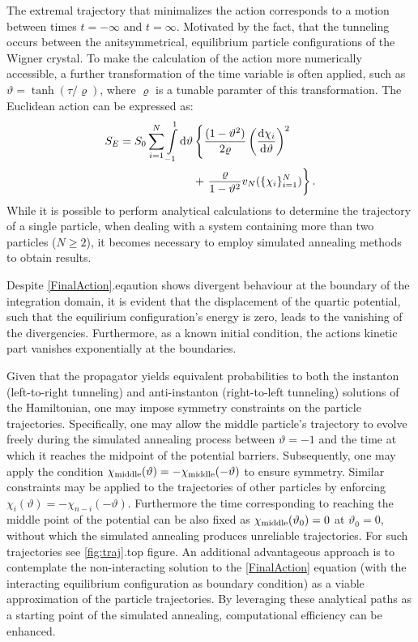\documentclass[prb,twocolumn,showpacs,preprintnumbers,amsmath,amssymb, superscriptaddress]{revtex4-2}
\newcommand{\n}{N}
\newcommand{\1}{{1\hspace*{-0.5ex} \textrm{l} \hspace*{0.5ex}}}
\begin{document}
The extremal trajectory that minimalizes the action corresponds to a motion between times $t = -\infty$ and $t = \infty$. Motivated by the fact, that the tunneling occurs between the anitsymmetrical, equilibrium particle configurations of the Wigner crystal. To make the calculation of the action more numerically accessible, a further transformation of the time variable is often applied, such as $\vartheta = \tanh\left( {\tau}/{\varrho} \right)$, where $\varrho$ is a tunable paramter of this transformation. The Euclidean action can be expressed as:
\begin{align}\label{FinalAction}
S_E = S_0 \sum_{i = 1}^\n \int\limits_{-1}^{1} {\rm{d}}\vartheta &\left\lbrace \frac{(1 - \vartheta^2)}{2\varrho} \left( \frac{{\rm{d}}\chi_i}{{\rm{d}}\vartheta} \right)^2 \right.\\ \nonumber
&+ \left. \frac{\varrho}{1 - \vartheta^2} v_\n(\{\chi_i\}_{i=1}^\n) \right\rbrace.
\end{align}
While it is possible to perform analytical calculations to determine the trajectory of a single particle, when dealing with a system containing more than two particles ($N \geq 2$), it becomes necessary to employ simulated annealing methods to obtain results.

Despite \eqref{FinalAction}.eqaution shows divergent behaviour at the boundary of the integration domain, it is evident that the displacement of the quartic potential, such that the equilirium configuration's energy is zero, leads to the vanishing of the divergencies. Furthermore, as a known initial condition, the actions kinetic part vanishes exponentially at the boundaries.

Given that the propagator yields equivalent probabilities to both the instanton (left-to-right tunneling) and anti-instanton (right-to-left tunneling) solutions of the Hamiltonian, one may impose symmetry constraints on the particle trajectories. Specifically, one may allow the middle particle's trajectory to evolve freely during the simulated annealing process between $\vartheta=-1$ and the time at which it reaches the midpoint of the potential barriers. Subsequently, one may apply the condition $\chi_{\rm{middle}}(\vartheta)=-\chi_{\rm{middle}}(-\vartheta)$ to ensure symmetry. Similar constraints may be applied to the trajectories of other particles by enforcing $\chi_{i}(\vartheta)=-\chi_{n-i}(-\vartheta)$. Furthermore the time corresponding to reaching the middle point of the potential can be also fixed as $\chi_{\rm{middle}}(\vartheta_0) = 0$ at $\vartheta_0 = 0$, without which the simulated annealing produces unreliable trajectories. For such trajectories see \ref{fig:traj}.top figure. An additional advantageous approach is to contemplate the non-interacting solution to the \eqref{FinalAction} equation (with the interacting equilibrium configuration as boundary condition) as a viable approximation of the particle trajectories. By leveraging these analytical paths as a starting point of the simulated annealing, computational efficiency can be enhanced.\\
\end{document}
